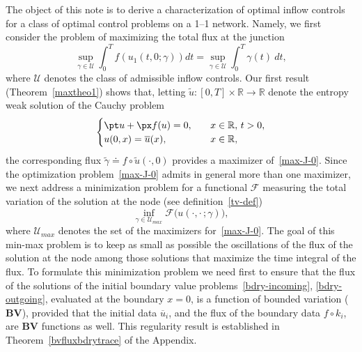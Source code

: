 \documentclass[a4paper, 10pt, final]{article}
\newcommand{\R}{\mathbb{R}} \newcommand{\N}{\mathbb{N}}
\newcommand{\BV}{\mathbf{BV}}
\begin{document}
The object of this note is to derive a characterization of optimal inflow controls for a class
of optimal control problems on  a 1–1 network.
Namely, we first consider the problem of maximizing the total flux at the junction
\begin{equation}\label{max-J-0}
  \sup_{\gamma \in \mathcal{U}} \int_0^T 
  f(u_1(t, 0;\gamma)) dt
  = \sup_{\gamma \in {\mathcal{U}}} \int_0^T   \gamma(t) \  dt,
\end{equation}
where $\mathcal{U}$ denotes the class of admissible inflow controls.
Our first result (Theorem~\ref{maxtheo1}) shows that, letting $\widetilde u :[0,T]\times \R\to\R$
denote the entropy weak solution of the Cauchy problem
\begin{equation}
  \label{eq:CP-classic}
\begin{cases} \pt u + \px f(u) = 0, \quad & x \in \R, \, t > 0,\\ 
    u(0,x)= \overline u(x), & x \in \R,\end{cases}
\end{equation}
the corresponding flux $\widetilde\gamma\doteq f\circ \widetilde u(\cdot, 0)$ provides a maximizer of~\eqref{max-J-0}.
Since the optimization problem~\eqref{max-J-0} admits in general more than one maximizer, we next address a
minimization problem for a functional 
$\mathcal F$ measuring the total variation of the solution at the node (see definition~\eqref{tv-def})
\begin{equation}\label{maxmin-0}
  \inf_{\gamma \in \mathcal{U}_{max}} \mathcal F\big(u(\cdot,\cdot\,;\gamma)\big),
\end{equation} 
where $\mathcal{U}_{max}$ denotes the set of the maximizers for~\eqref{max-J-0}. 
The goal of this min-max problem is to keep as small as possible the oscillations of the 
flux of the solution at the node among those solutions that maximize the time integral of the  flux. 
To formulate this
minimization problem
we need first to ensure 
that the flux of the solutions of the initial boundary value problems~\eqref{bdry-incoming}, \eqref{bdry-outgoing}, 
evaluated at the boundary $x=0$, is a function of bounded variation ($\mathbf{BV}$), 
provided that the initial data $\overline{u}_i$,
and the
flux of the boundary data $f\circ k_i$,  are $\BV$ functions as well. 
This regularity result 
is established in Theorem~\ref{bvfluxbdrytrace}
of the Appendix.
 
\end{document}
